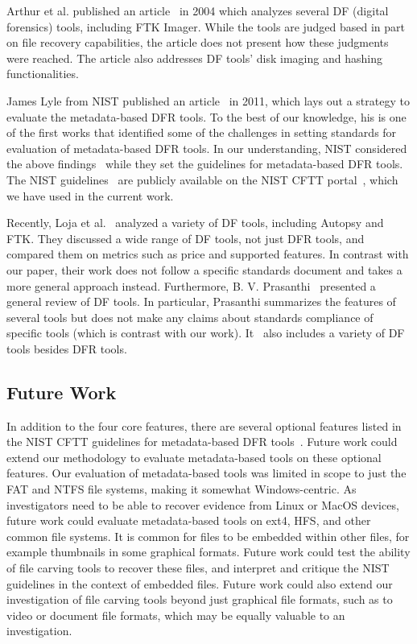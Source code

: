 \begin{paraphrase}
 Arthur et al. published an article~\cite{arthur2004} in 2004 which analyzes several DF (digital forensics) tools, including FTK Imager.
While the tools are judged based in part on file recovery capabilities, the article does not present how these judgments were reached.
The article also addresses DF tools' disk imaging and hashing functionalities.

James Lyle from NIST published an article~\cite{lyle2011-ICDF2C} in 2011, which lays out a strategy to evaluate the metadata-based DFR tools. To the best of our knowledge, 
his is one of the first works that identified some of the challenges in setting standards for evaluation of metadata-based DFR tools.
In our understanding, NIST considered the above findings~\cite{lyle2011-ICDF2C} while they set the guidelines for metadata-based DFR tools.  
The NIST guidelines~\cite{meta:dfr:standards} are publicly available on the NIST CFTT portal~\cite{cftt:nist}, which we have used in the current work.

Recently, Loja et al.~\cite{loja2016} analyzed a variety of DF tools, including Autopsy and FTK. 
They discussed a wide range of DF tools, not just DFR tools, and compared them on metrics such as price and supported features. 
In contrast with our paper, their work does not follow a specific standards document and takes a more general approach instead.
Furthermore, B. V. Prasanthi~\cite{prasanthi2016} presented a general review of DF tools. 
In particular, Prasanthi summarizes the features of several tools but does not make any claims about standards compliance of specific tools (which is contrast with our work).
It~\cite{prasanthi2016} also includes a variety of DF tools besides DFR tools.
\end{paraphrase}


\subsection{Future Work}

In addition to the four core features, there are several optional features listed in the NIST CFTT guidelines for metadata-based DFR tools~\cite{meta:dfr:standards}.
Future work could extend our methodology to evaluate metadata-based tools on these optional features.
Our evaluation of metadata-based tools was limited in scope to just the FAT and NTFS file systems, making it somewhat Windows-centric.
As investigators need to be able to recover evidence from Linux or MacOS devices, future work could evaluate metadata-based tools on ext4, HFS, and other common file systems.
It is common for files to be embedded within other files, for example thumbnails in some graphical formats.
Future work could test the ability of file carving tools to recover these files, and interpret and critique the NIST guidelines in the context of embedded files.
Future work could also extend our investigation of file carving tools beyond just graphical file formats, such as to video or document file formats, which may be equally valuable to an investigation.
